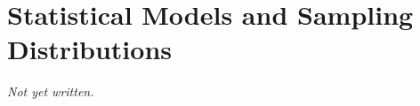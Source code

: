 \chapter{Statistical Models and Sampling Distributions}\label{ch:sampling-distributions}


\textit{Not yet written.}
